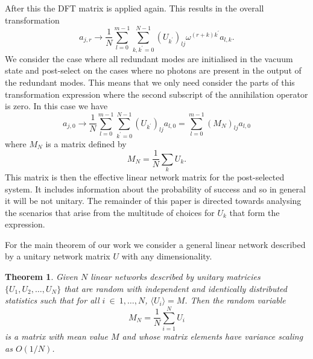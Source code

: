 \documentclass[aps,pra,twocolumn,superscriptaddress,numerical,floatfix]{revtex4-1}
\newtheorem{theorem}{Theorem}
\begin{document}
After this the DFT matrix is applied again.  This results in the overall transformation
\begin{equation}
	a_{j,r} \rightarrow \frac{1}{N} 
	\sum_{l=0}^{m-1} \sum_{k,k^\prime=0}^{N-1}
	(U_{k^\prime})_{lj} \omega^{(r+k)k^\prime} a_{l,k}.
\end{equation}
We consider the case where all redundant modes are initialised in the vacuum state and post-select on the cases where no photons are present in the output of the redundant modes.  This means that we only need consider the parts of this transformation expression where the second subscript of the annihilation operator is zero.  In this case we have
\begin{equation}
	\label{sum_transformation}
	a_{j,0} \rightarrow \frac{1}{N}\sum_{l=0}^{m-1} \sum_{k^\prime=0}^{N-1}
	(U_{k^\prime})_{lj} a_{l,0} = \sum_{l=0}^{m-1} (M_N)_{lj} a_{l,0}
\end{equation}
where $M_N$ is a matrix defined by
\begin{equation}
	M_N = \frac{1}{N} \sum_k U_k.
\end{equation}
This matrix is then the effective linear network matrix for the post-selected system.  It includes information about the probability of success and so in general it will be not unitary.  The remainder of this paper is directed towards analysing the scenarios that arise from the multitude of choices for $U_k$ that form the expression.

For the main theorem of our work we consider a general linear network described by a unitary network matrix $U$ with any dimensionality. 


\begin{theorem}
\label{Theorem 1}
Given $N$ linear networks described by unitary matricies $\{U_1,U_2,\ldots,U_N\}$ that are random with independent and identically distributed statistics such that for all $i~\in~{1,\ldots,N}$, $\langle U_i \rangle = M$.  Then the random variable 
\begin{equation}
	\label{sum_unitary}
	M_{N}=\frac{1}{N}\sum_{i=1}^{N}U_{i}
\end{equation}
is a matrix with mean value $M$ and whose matrix elements have variance scaling as $O(1/N)$.
\end{theorem}
\end{document}
